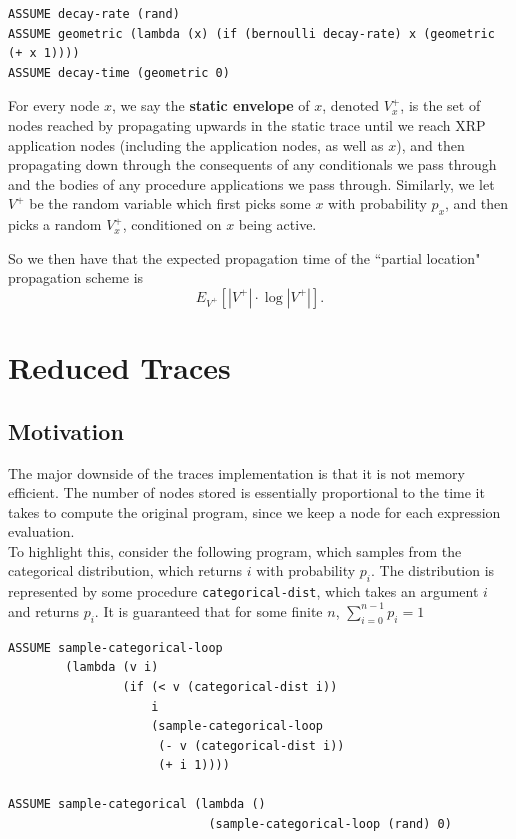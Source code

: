 \documentclass[10pt]{article}
\begin{document}
\begin{leftbar} \begin{small} \begin{verbatim}
ASSUME decay-rate (rand)
ASSUME geometric (lambda (x) (if (bernoulli decay-rate) x (geometric (+ x 1))))
ASSUME decay-time (geometric 0)
\end{verbatim} \end{small} \end{leftbar}

For every node $x$, we say the {\bf static envelope} of $x$, denoted $V^+_x$, is the set of nodes reached by propagating upwards in the static trace until we reach XRP application nodes (including the application nodes, as well as $x$), and then propagating down through the consequents of any conditionals we pass through and the bodies of any procedure applications we pass through.  Similarly, we let $V^+$ be the random variable which first picks some $x$ with probability $p_x$, and then picks a random $V^+_x$, conditioned on $x$ being active.

So we then have that the expected propagation time of the ``partial location" propagation scheme is 
$$ E_{V^+}[|V^+| \cdot \log |V^+|]. $$

\section{Reduced Traces}

\subsection{Motivation}

The major downside of the traces implementation is that it is not memory efficient.  The number of nodes stored is essentially proportional to the time it takes to compute the original program, since we keep a node for each expression evaluation.  \\



To highlight this, consider the following program, which samples from the categorical distribution, which returns $i$ with probability $p_i$.   The distribution is represented by some procedure {\tt categorical-dist}, which takes an argument $i$ and returns $p_i$.  It is guaranteed that for some finite $n$, $\sum_{i = 0}^{n-1} p_i = 1$

\begin{leftbar} \begin{small} \begin{verbatim}
ASSUME sample-categorical-loop 
        (lambda (v i)
                (if (< v (categorical-dist i)) 
                    i 
                    (sample-categorical-loop 
                     (- v (categorical-dist i))
                     (+ i 1))))

ASSUME sample-categorical (lambda () 
                            (sample-categorical-loop (rand) 0)
\end{verbatim} \end{small} \end{leftbar}
\end{document}
